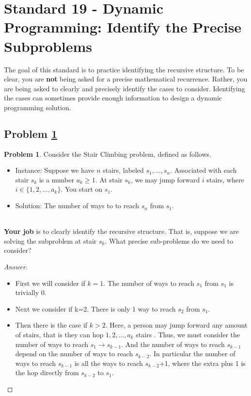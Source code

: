 \documentclass[11pt]{article}
\theoremstyle{definition}
\theoremstyle{definition}
\newtheorem{required}{Problem}
\theoremstyle{definition}
\begin{document}
\newpage
\section{Standard 19 - Dynamic Programming: Identify the Precise Subproblems}

\noindent The goal of this standard is to practice identifying the recursive structure. To be clear, you are \textbf{not} being asked for a precise mathematical recurrence. Rather, you are being asked to clearly and precisely identify the cases to consider. Identifying the cases can sometimes provide enough information to design a dynamic programming solution.

\subsection{Problem \ref{DP1}}
\begin{required} \label{DP1}
Consider the \textsf{Stair Climbing} problem, defined as follows.
\begin{itemize}
\item \textsf{Instance:} Suppose we have $n$ stairs, labeled $s_{1}, \ldots, s_{n}$. Associated with each stair $s_{k}$ is a number $a_{k} \geq 1$. At stair $s_{k}$, we may jump forward $i$ stairs, where $i \in \{ 1, 2, \ldots, a_{k}\}$. You start on $s_{1}$.

\item \textsf{Solution:} The number of ways to to reach $s_{n}$ from $s_{1}$.
\end{itemize}

\noindent \\ \textbf{Your job} is to clearly identify the recursive structure. That is, suppose we are solving the subproblem at stair $s_{k}$. What precise sub-problems do we need to consider?
\end{required}

\begin{proof}[Answer]

\begin{itemize}
\item First we will consider if $k=1$. The number of ways to reach $s_1$ from $s_1$ is trivially 0.
\item Next we consider if k=2. There is only 1 way to reach $s_2$ from $s_1$.
\item Then there is the case if $k>2$. Here, a person may jump forward any amount of stairs, that is they can hop $1, 2, \ldots, a_{k}$ stairs . Thus, we must consider the number of ways to reach $s_1 \rightarrow s_{k-1}$. And the number of ways to reach $s_{k-1}$ depend on the number of ways to reach $s_{k-2}$. In particular the number of ways to reach $s_{k-1}$ is all the ways to reach $s_{k-2}$+1, where the extra plus 1 is the hop directly from $s_{k-2}$ to $s_{1}$. 
\end{itemize}
\end{proof}
\end{document}
